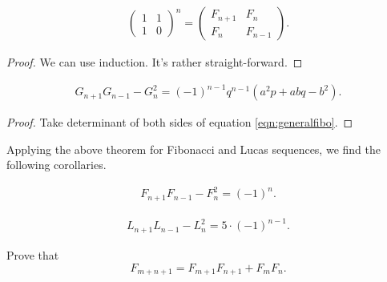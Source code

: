 \documentclass{subfile}
\begin{document}
\begin{corollary}
\begin{align*}
\begin{pmatrix}
1 & 1\\
1 & 0
\end{pmatrix}^n=
\begin{pmatrix}
F_{n+1} & F_{n}\\
F_n & F_{n-1}
\end{pmatrix}.
\end{align*}
\end{corollary}

\begin{proof}
We can use induction. It's rather straight-forward.
\end{proof}

\begin{theorem}\slshape
\begin{align*}
G_{n+1}G_{n-1}-G_n^2=(-1)^{n-1}q^{n-1}\left(a^2p+abq-b^2\right).
\end{align*}
\end{theorem}

\begin{proof}
Take determinant of both sides of equation \eqref{eqn:generalfibo}.
\end{proof}
Applying the above theorem for Fibonacci and Lucas sequences, we find the following corollaries.
\begin{corollary}
\begin{align*}
F_{n+1}F_{n-1}-F_n^2=(-1)^n.
\end{align*}
\end{corollary}

\begin{corollary}
\begin{align*}
L_{n+1}L_{n-1}-L_n^2=5\cdot(-1)^{n-1}.
\end{align*}
\end{corollary}

\begin{problem}
Prove that
\begin{equation}
F_{m+n+1}=F_{m+1}F_{n+1}+F_mF_n.
\end{equation}
\end{problem}
\end{document}
